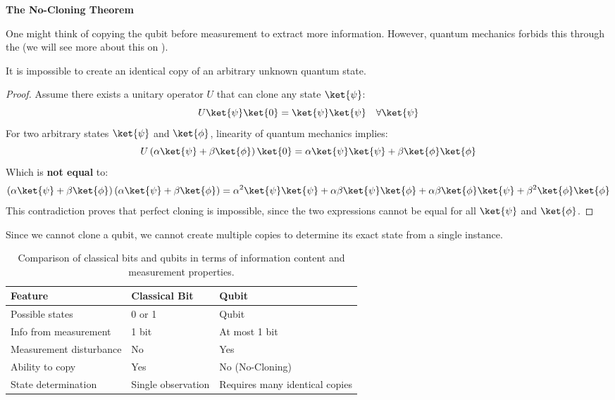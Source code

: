 \highspace
\begin{flushleft}
    \textcolor{Red2}{ \textbf{The No-Cloning Theorem}}
\end{flushleft}
One might think of copying the qubit before measurement to extract more information. However, quantum mechanics forbids this through the  (we will see more about this on ).

\begin{theorem}\label{thm:no-cloning}
    It is impossible to create an identical copy of an arbitrary unknown quantum state.
\end{theorem}
\begin{proof}
    Assume there exists a unitary operator $U$ that can clone any state $\ket{\psi}$:
    \begin{equation*}
        U\ket{\psi}\ket{0} = \ket{\psi}\ket{\psi} \quad \forall \ket{\psi}
    \end{equation*}
    For two arbitrary states $\ket{\psi}$ and $\ket{\phi}$, linearity of quantum mechanics implies:
    \begin{equation*}
        U\left(\alpha\ket{\psi} + \beta\ket{\phi}\right)\ket{0} = \alpha\ket{\psi}\ket{\psi} + \beta\ket{\phi}\ket{\phi}
    \end{equation*}
    Which is \textbf{not equal} to:
    \begin{equation*}
        \left(\alpha\ket{\psi} + \beta\ket{\phi}\right)\left(\alpha\ket{\psi} + \beta\ket{\phi}\right) = \alpha^2\ket{\psi}\ket{\psi} + \alpha\beta\ket{\psi}\ket{\phi} + \alpha\beta\ket{\phi}\ket{\psi} + \beta^2\ket{\phi}\ket{\phi}
    \end{equation*}
    This contradiction proves that perfect cloning is impossible, since the two expressions cannot be equal for all $\ket{\psi}$ and $\ket{\phi}$.
\end{proof}

\noindent
Since we cannot clone a qubit, we cannot create multiple copies to determine its exact state from a single instance.

\begin{table}[!htp]
    \centering
    \begin{tabular}{@{} p{9em} l l @{}}
        \toprule
        Feature & Classical Bit & Qubit \\
        \midrule
        Possible states & 0 or 1 & Qubit \\[.2em]
        Info from measurement & 1 bit & At most 1 bit \\[.2em]
        Measurement disturbance & No & Yes \\[.2em]
        Ability to copy & Yes & No (No-Cloning) \\[.2em]
        State determination & Single observation & Requires many identical copies \\
        \bottomrule
    \end{tabular}
    \caption{Comparison of classical bits and qubits in terms of information content and measurement properties.}
\end{table}